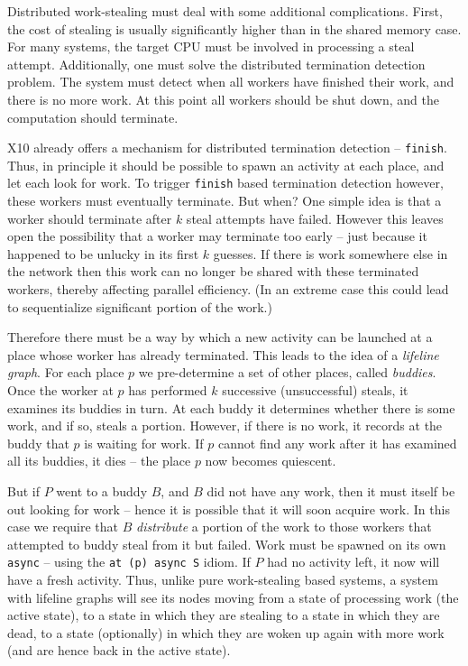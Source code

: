 Distributed work-stealing must deal with some additional
complications. First, the cost of stealing is usually significantly
higher than in the shared memory case. For many systems, the target
CPU must be involved in processing a steal attempt. Additionally, one
must solve the distributed termination detection problem. The system
must detect when all workers have finished their work, and there is no
more work. At this point all workers should be shut down, and the
computation should terminate. 

X10 already offers a mechanism for distributed termination detection
-- \texttt{finish}. Thus, in principle it should be possible to spawn
an activity at each place, and let each look for work. To trigger
\texttt{finish} based termination detection however, these workers
must eventually terminate. But when? One simple idea is that a worker
should terminate after $k$ steal attempts have failed. However this
leaves open the possibility that a worker may terminate too early --
just because it happened to be unlucky in its first $k$ guesses. If
there is work somewhere else in the network then this work
can no longer be shared with these terminated workers, thereby
affecting parallel efficiency. (In an extreme case this could lead to
sequentialize significant portion of the work.) 

Therefore there must be a way by which a new activity can be launched 
at a place whose worker has already terminated. This leads to the idea
of a {\em lifeline graph}. For each place $p$ we pre-determine a set of
other places, called {\em buddies}. Once the worker at $p$ has
performed $k$ successive (unsuccessful) steals, it examines its
buddies in turn. At each buddy it determines whether there is some
work, and if so, steals a portion. However, if there is no work, it
records at the buddy that $p$ is waiting for work. If $p$ cannot find
any work after it has examined all its buddies, it dies -- the place $p$
now becomes quiescent.  

But if $P$ went to a buddy $B$, and $B$ did not have any work, then
it must itself be out looking for work -- hence it is possible that it
will soon acquire work. In this case we require that $B$ {\em
  distribute} a portion of the work to those workers that attempted to
buddy steal from it but failed. Work must be spawned on its own
\texttt{async} -- using the \texttt{at (p) async S} idiom. If $P$ had
 no activity left, it now will have a fresh activity. Thus, unlike
 pure work-stealing based systems, a system with lifeline graphs will
 see its nodes moving from a state of processing work (the active state), to a state in
 which they are stealing to a state in which they are dead, to a state
 (optionally) in which they are woken up again with more work (and are
 hence back in the active state).  

